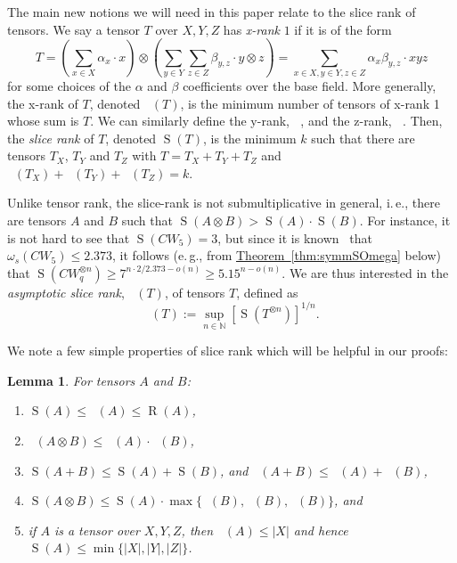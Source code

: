 \documentclass[11pt]{article}
\numberwithin{equation}{section}
\newtheorem{lemma}[theorem]{Lemma}
\theoremstyle{definition}
\theoremstyle{plain}
\newcommand{\N}{\mathbb N}
\newcommand{\ie}{i.\,e.}
\newcommand{\eg}{e.\,g.}
\newcommand{\expref}[2]{\hyperref[#2]{#1~\ref{#2}}}
\newcommand{\sr}{\mathop{\operatorname{S}}}
\newcommand{\xr}{\mathop{\operatorname{S_x}}}
\newcommand{\yr}{\mathop{\operatorname{S_y}}}
\newcommand{\zr}{\mathop{\operatorname{S_z}}}
\newcommand{\rr}{\mathop{\operatorname{R}}}
\newcommand{\tsr}{\mathop{\tilde{\operatorname{S}}}}
\theoremstyle{definition}
\begin{document}
The main new notions we will need in this paper relate to the slice rank of tensors. We say a tensor $T$ over $X,Y,Z$ has \emph{x-rank} $1$ if it is of the form
$$T = \left( \sum_{x \in X} \alpha_x \cdot x \right) \otimes \left( \sum_{y \in Y} \sum_{z \in Z} \beta_{y,z} \cdot y \otimes z \right) = \sum_{x \in X, y \in Y, z \in Z} \alpha_x \beta_{y,z} \cdot xyz$$
for some choices of the $\alpha$ and $\beta$ coefficients over the base field. More generally, the x-rank of $T$, denoted $\xr(T)$, is the minimum number of tensors of x-rank 1 whose sum is $T$. We can similarly define the y-rank, $\yr$, and the z-rank, $\zr$. Then, the \emph{slice rank} of $T$, denoted $\sr(T)$, is the minimum $k$ such that there are tensors $T_X$, $T_Y$ and $T_Z$ with $T = T_X + T_Y + T_Z$ and $\xr(T_X) + \yr(T_Y) + \zr(T_Z) = k$.

Unlike tensor rank, the slice-rank is not submultiplicative in general, \ie, there are tensors $A$ and $B$ such that $\sr(A \otimes B) > \sr(A) \cdot \sr(B)$. For instance, it is not hard to see that $\sr(CW_5) = 3$, but since 
%
it is known~\cite{v12,legall,awrefined} that $\omega_s(CW_5) \leq 2.373$, 
it follows (\eg, from \expref{Theorem}{thm:symmSOmega} below) that $\sr(CW_q^{\otimes n}) \geq 7^{n \cdot 2/2.373 - o(n)} \geq 5.15^{n - o(n)}$. We are thus interested in the \emph{asymptotic slice rank}, $\tsr(T)$, of tensors $T$, defined as
$$\tsr(T) := \sup_{n \in \N} [\sr(T^{\otimes n})]^{1/n}.$$

We note a few simple properties of slice rank which will be helpful in our proofs:

\begin{lemma} \label{propertieslemma}
For tensors $A$ and $B$:

\begin{enumerate}[(1)]
    \item $\sr(A) \leq \xr(A) \leq \rr(A)$,
    \item $\xr(A \otimes B) \leq \xr(A) \cdot \xr(B)$,
    \item $\sr(A + B) \leq \sr(A) + \sr(B)$, and $\xr(A+B) \leq \xr(A) + \xr(B)$,
    \item $\sr(A \otimes B) \leq \sr(A) \cdot \max \{ \xr(B), \yr(B), \zr(B) \}$, and
    \item if $A$ is a tensor over $X,Y,Z$, then $\xr(A) \leq |X|$ and hence $\sr(A) \leq \min\{ |X|, |Y|, |Z|\}$. \label{propertieslemmapt5}
\end{enumerate}
\end{lemma}
\end{document}
